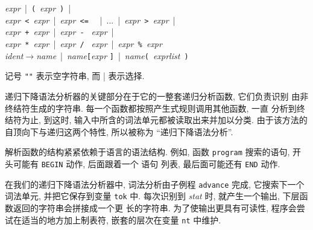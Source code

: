 \begin{tabbing}
    \textit{expr}\ |\ \texttt{(}\ \textit{expr}\ \texttt{)}\ | \\
    \>\>\textit{expr}\texttt{ < }\textit{expr}\ |\ \textit{expr}\texttt{ <= }
    \ |\ ...\ |\ \textit{expr}\texttt{ > }\textit{expr}\ |\\
    \>\>\textit{expr}\texttt{ + }\textit{expr}\ |\ \textit{expr}\texttt{ - }
    \textit{expr}\ |\\
    \>\>\textit{expr}\texttt{ * }\textit{expr}\ |\ \textit{expr}\texttt{ / }
    \textit{expr}\ |\ \textit{expr}\verb' % '\textit{expr}\\
    \hspace{4em}
    \textit{ident}\>$\to$\>\textit{name}\ |\ \textit{name}\texttt{[}\textit{expr}%
    \texttt{]}\ |\ \textit{name}\texttt{( }\textit{exprlist}\texttt{ )}
\end{tabbing}
记号 \texttt{""} 表示空字符串, 而 | 表示选择.

递归下降语法分析器的关键部分在于它的一整套递归分析函数, 它们负责识别
由非终结符生成的字符串. 每一个函数都按照产生式规则调用其他函数, 一直
分析到终结符为止, 到这时, 输入中所含的词法单元都被读取出来并加以分类.
由于该方法的自顶向下与递归这两个特性, 所以被称为 ``递归下降语法分析''.

解析函数的结构紧紧依赖于语言的语法结构. 例如, 函数 \texttt{program}
搜索的语句, 开头可能有 \texttt{BEGIN} 动作, 后面跟着一个 \patact 语句
列表, 最后面可能还有 \texttt{END} 动作.

在我们的递归下降语法分析器中, 词法分析由子例程 \texttt{advance} 完成, 
它搜索下一个词法单元, 并把它保存到变量 \texttt{tok} 中. 每次识别到 
\textit{stat} 时, 就产生一个输出, 下层函数返回的字符串会拼接成一个更
长的字符串. 为了使输出更具有可读性, 程序会尝试在适当的地方加上制表符,
嵌套的层次在变量 \texttt{nt} 中维护.

